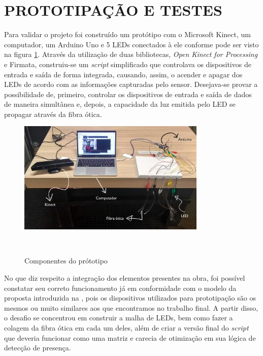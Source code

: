 \section{PROTOTIPAÇÃO E TESTES}

Para validar o projeto foi construído um protótipo com o Microsoft Kinect, um computador, um Arduino Uno e 5 LEDs conectados à ele conforme pode ser visto na figura \ref{fig:prototipo}. Através da utilização de duas bibliotecas, \textit{Open Kinect for Processing} e Firmata, construiu-se um \textit{script} simplificado que controlava os dispositivos de entrada e saída de forma integrada, causando, assim, o acender e apagar dos LEDs de acordo com as informações capturadas pelo sensor. Desejava-se provar a possibilidade de, primeiro, controlar os dispositivos de entrada e saída de dados de maneira simultânea e, depois, a capacidade da luz emitida pelo LED se propagar através da fibra ótica.

\begin{figure}[H]
  \begin{center}
    \caption{Componentes do prótotipo}
    \vspace*{0,2cm}
    \includegraphics[width=0.8\textwidth]{./04-figuras/prototipo}
    \label{fig:prototipo}
  \end{center}
  \vspace*{-0,9cm}
  \\
\end{figure}

No que diz respeito a integração dos elementos presentes na obra, foi possível constatar seu correto funcionamento já em conformidade com o modelo da proposta introduzida na , pois os dispositivos utilizados para prototipação são os mesmos ou muito similares aos que encontramos no trabalho final. A partir disso, o desafio se concentrou em construir a malha de LEDs, bem como fazer a colagem da fibra ótica em cada um deles, além de criar a versão final do \textit{script} que deveria funcionar como uma matriz e carecia de otimização em sua lógica de detecção de presença.

